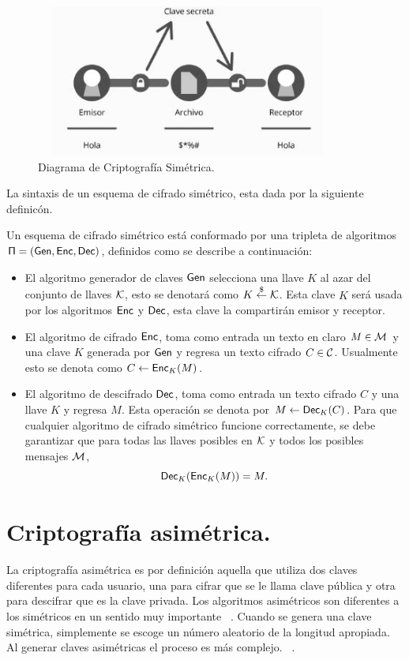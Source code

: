 \begin{figure}[H]
\centering
	\includegraphics[width=10cm, height=5cm]{./images/Cripto_Simetrica.jpg}
	\caption{Diagrama de Criptografía Simétrica.}
	\label{fig:1-2-3}
\end{figure}
La sintaxis de un esquema de cifrado sim\'etrico, esta dada por la siguiente definic\'on.
\begin{definition} 
Un esquema de cifrado sim\'etrico est\'a conformado por una tripleta de algoritmos 
$\sf \Pi=(Gen, Enc, Dec)$, definidos como se describe a continuaci\'on:
\begin{itemize}
\item  El algoritmo generador de claves $\sf Gen$ selecciona una llave  $K$ al azar del conjunto de llaves $\cal K$, esto se denotar\'a como $K \stackrel{\$}\leftarrow {\cal K}$.
Esta clave $K$  ser\'a usada por los algoritmos  $\sf Enc$ y $\sf Dec$, esta clave la compartir\'an  emisor y receptor. 
\item El algoritmo de cifrado $\sf Enc$, toma como entrada un texto en claro  $M \in {\cal M}$ y una clave $K$ generada por  $\sf Gen$  y regresa un texto cifrado $C \in {\cal C}$.  Usualmente esto se denota como $C \leftarrow {\sf Enc}_K(M)$.
 \item El algoritmo de descifrado $\sf Dec$, toma como entrada un texto cifrado $C$ y una llave $K$ y regresa $M$. Esta operaci\'on se denota por  $M \leftarrow {\sf Dec}_K(C)$.
Para que cualquier algoritmo de cifrado sim\'etrico funcione correctamente, se debe garantizar que para
todas las llaves posibles en  $\cal K$ y todos los posibles mensajes $\cal M$, $$ {\sf Dec}_K({\sf Enc}_K(M)) = M.$$
\end{itemize}
\end{definition}

\section{Criptografía asimétrica. }
La criptografía asimétrica es por definición aquella que utiliza dos claves diferentes para cada usuario, una para cifrar que se le llama clave pública y otra para descifrar que es la clave privada. Los algoritmos asimétricos son diferentes a los simétricos en un sentido muy importante ~\cite{sime}. Cuando se genera una clave simétrica, simplemente se escoge un número aleatorio de la longitud apropiada. Al generar claves asimétricas el proceso es más complejo. ~\cite{sime}.

